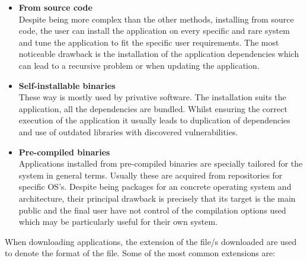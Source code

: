 \documentclass[10pt,a4paper]{article}
\begin{document}
	\begin{itemize}
		\item \textbf{From source code}\\ Despite being more complex than the other methods, installing from source code, the user can install the application on every specific and rare system and tune the application to fit the specific user requirements. The most noticeable drawback is the installation of the application dependencies which can lead to a recursive problem or when updating the application.
		
		\item \textbf{Self-installable binaries}\\
		These way is mostly used by privative software. The installation suits the application, all the dependencies are bundled. Whilst ensuring the correct execution of the application it usually leads to duplication of dependencies and use of outdated libraries with discovered vulnerabilities.
		 
		\item \textbf{Pre-compiled binaries}\\ Applications installed from pre-compiled binaries are specially tailored for the system in general terms. Usually these are acquired from repositories for specific OS's. Despite being packages for an concrete operating system and architecture, their principal drawback is precisely that its target is the main public and the final user have not control of the compilation options used which may be particularly useful for their own system.
		
	\end{itemize}
	When downloading applications, the extension of the file/s downloaded are used to denote the format of the file. Some of the most common extensions are:
\end{document}
